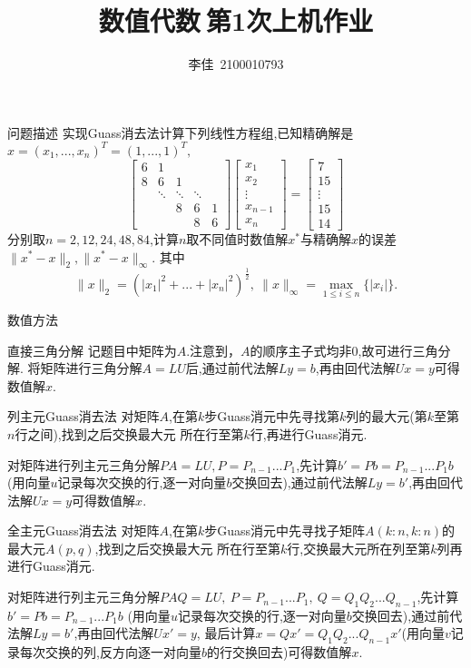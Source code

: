 \documentclass{article}
\title{数值代数$\ $第1次上机作业}
\author{李佳~2100010793}
\date{}
\begin{document}
\maketitle
\begin{section}{问题描述}
\noindent 实现Guass消去法计算下列线性方程组,已知精确解是$x=(x_1,...,x_n)^T=(1,...,1)^T,$
    $$\begin{bmatrix} 
        6&1& & & \\
        8&6&1& & \\
         &\ddots&\ddots&\ddots& \\
         & &8&6&1\\
         & & &8&6
    \end{bmatrix}
    \begin{bmatrix}
        x_1\\x_2\\\vdots\\x_{n-1}\\x_n
    \end{bmatrix} = 
    \begin{bmatrix}
        7\\15\\\vdots\\15\\14
    \end{bmatrix}$$
    分别取$n=2,12,24,48,84$,计算$n$取不同值时数值解$x^*$与精确解$x$的误差$\| x^*-x\|_2,\| x^*-x\|_{\infty}.$
    其中$$\| x\|_2 = (\left\lvert x_1\right\rvert^2+...+\left\lvert x_n\right\rvert^2 )^{\frac{1}{2}},
    \ \| x\|_{\infty} = \max_{1\leq i\leq n}\{\left\lvert x_i\right\rvert \}.$$
\end{section}
\begin{section}{数值方法}
    \begin{subsection}{直接三角分解}
        记题目中矩阵为$A$.注意到，$A$的顺序主子式均非$0$,故可进行三角分解.
        将矩阵进行三角分解$A=LU$后,通过前代法解$Ly=b$,再由回代法解$Ux=y$可得数值解$x$.
    \end{subsection}
    \begin{subsection}{列主元Guass消去法}
        对矩阵$A$,在第$k$步Guass消元中先寻找第$k$列的最大元(第$k$至第$n$行之间),找到之后交换最大元
        所在行至第$k$行,再进行Guass消元.

        对矩阵进行列主元三角分解$PA=LU,P=P_{n-1}...P_1$,先计算$b'=Pb=P_{n-1}...P_1b$
        (用向量$u$记录每次交换的行,逐一对向量$b$交换回去),通过前代法解$Ly=b'$,再由回代法解$Ux=y$可得数值解$x$.
    \end{subsection}
    \begin{subsection}{全主元Guass消去法}
        对矩阵$A$,在第$k$步Guass消元中先寻找子矩阵$A(k:n,k:n)$的最大元$A(p,q)$,找到之后交换最大元
        所在行至第$k$行,交换最大元所在列至第$k$列再进行Guass消元.

        对矩阵进行列主元三角分解$PAQ=LU,\ P=P_{n-1}...P_1,\ Q=Q_1Q_2...Q_{n-1}$,先计算$b'=Pb=P_{n-1}...P_1b$
        (用向量$u$记录每次交换的行,逐一对向量$b$交换回去),通过前代法解$Ly=b'$,再由回代法解$Ux'=y$,
        最后计算$x=Qx'=Q_1Q_2...Q_{n-1}x'$(用向量$v$记录每次交换的列,反方向逐一对向量$b$的行交换回去)可得数值解$x$.
    \end{subsection}
\end{section}
\end{document}
